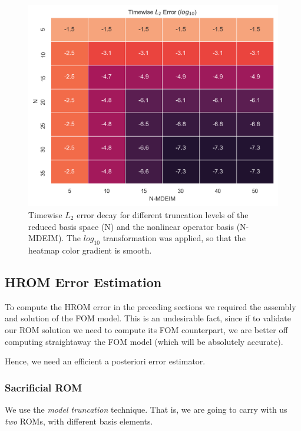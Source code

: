 \documentclass[../../thesis.tex]{subfiles}
\begin{document}
\begin{figure}[h]
    \centering
    \includegraphics[width=1\columnwidth]{research_project/piston/figures/mdeim_certification/error_decay_heatmap.png}
    \caption{Timewise $L_2$ error decay for different truncation levels 
    of the reduced basis space (N) 
    and the nonlinear operator basis (N-MDEIM).
    The $log_{10}$ transformation was applied, so that the heatmap color gradient is smooth.}
    \label{fig:nonlinear_error_decay_heatmap}
\end{figure}

\subsection{HROM Error Estimation}
\label{sec:hrom_results_posteriori_error_estimation}
To compute the HROM error in the preceding sections
we required the assembly and solution of the FOM model.
This is an undesirable fact, since if to validate our ROM solution
we need to compute its FOM counterpart, 
we are better off computing straightaway the FOM model 
(which will be absolutely accurate).

Hence, we need an efficient a posteriori error estimator.

\subsubsection{Sacrificial ROM}
We use the \textit{model truncation} technique.
That is, we are going to carry with us \textit{two} ROMs,
with different basis elements.
\end{document}

